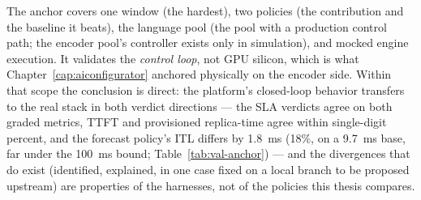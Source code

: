 The anchor covers one window (the hardest), two policies (the
contribution and the baseline it beats), the language pool (the pool
with a production control path; the encoder pool's controller exists
only in simulation), and mocked engine execution. It validates the
\emph{control loop}, not GPU silicon, which is what
Chapter~\ref{cap:aiconfigurator} anchored physically on the encoder
side. Within that scope the conclusion is direct: the platform's
closed-loop behavior transfers to the real stack in both verdict
directions --- the SLA verdicts agree on both graded metrics,
TTFT and provisioned replica-time agree within single-digit percent, and the
forecast policy's ITL differs by \SI{1.8}{\milli\second} (18\%, on a
\SI{9.7}{\milli\second} base, far under the \SI{100}{\milli\second} bound;
Table~\ref{tab:val-anchor}) --- and the divergences that
do exist
(identified, explained, in one case fixed on a local branch to be proposed upstream) are properties
of the harnesses, not of the policies this thesis compares.
